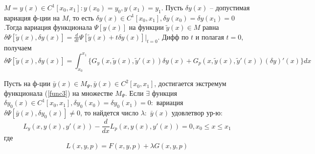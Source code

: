 $M = {y(x) \in C^1[x_0, x_1] : y(x_0) = y_0, y(x_1) = y_1}$.
Пусть $\delta y(x)$ – допустимая вариация ф-ции на $M$, то есть $\delta y(x) \in C^1[x_0, x_1], \delta y(x_0) = \delta y(x_1) = 0$.Тогда вариация функционала $\Psi [y(x)]$ на функции $\widetilde y(x)\in M$ равна $\delta \Psi[\widetilde y(x), \delta y(x)]=\frac{d}{dt}\Psi[\widetilde y(x) + t\delta y(x)]\Big|_{t=0}$. Дифф по $t$ и полагая $t = 0$, получаем 
$$\delta\Psi[\widetilde y(x), \delta y(x)]= \int_{x_0}^{x_1}\Big\{G_y(x, \widetilde y(x), \widetilde y'(x))\delta y(x) + G_p(x, \widetilde y(x), \widetilde y'(x))(\delta y)'(x) \Big\}dx$$
\begin{theorem}
    Пусть на ф-ции $\bar y(x) \in M_\Psi, \bar y(x) \in C^2[x_0, x_1]$,
    достигается экстремум функционала (\ref{func3}) на множестве $M_\Psi$. Если
    $\exists$ функция $\delta y_0(x) \in C^1[x_0, x_1], \delta y_0(x_0) = \delta y_0(x_1) = 0:$ вариация $\delta\Psi[\bar y(x), \delta y_0(x)] \neq 0$, то найдется число $\lambda:$ $\bar y(x)$ удовлетвор ур-ю:
    \begin{equation}
        L_y(x, y(x), y'(x))-\frac{d}{dx}L_p(x, y(x), y'(x))=0, x_0 \leq x \leq x_1
        \label{kak_ze_i_zaebalsya}
    \end{equation}
    где 
    \begin{equation}
        L(x, y, p) = F(x, y, p) + \lambda G(x, y, p)
        \label{wtf}
    \end{equation}

\end{theorem}
